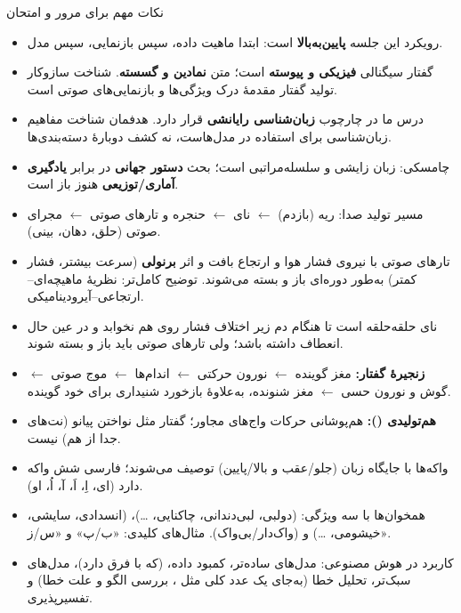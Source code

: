 \begin{exambox}{نکات مهم برای مرور و امتحان}
\begin{itemize}
  \item رویکرد این جلسه \textbf{پایین‌به‌بالا} است: ابتدا ماهیت داده، سپس بازنمایی، سپس مدل.
  \item گفتار سیگنالی \textbf{فیزیکی و پیوسته} است؛ متن \textbf{نمادین و گسسته}. شناخت سازوکار تولید گفتار مقدمهٔ درک ویژگی‌ها و بازنمایی‌های صوتی است.
  \item درس ما در چارچوب \textbf{زبان‌شناسی رایانشی} قرار دارد. هدفمان شناخت مفاهیم زبان‌شناسی برای استفاده در مدل‌هاست، نه کشف دوبارهٔ دسته‌بندی‌ها.
  \item چامسکی: زبان زایشی و سلسله‌مراتبی است؛ بحث \textbf{دستور جهانی} در برابر \textbf{یادگیری آماری/توزیعی} هنوز باز است.
  \item مسیر تولید صدا: ریه (بازدم) $\leftarrow$ نای $\leftarrow$ حنجره و تارهای صوتی $\leftarrow$ مجرای صوتی (حلق، دهان، بینی).
  \item تارهای صوتی با نیروی فشار هوا و ارتجاع بافت و اثر \textbf{برنولی} (سرعت بیشتر، فشار کمتر) به‌طور دوره‌ای باز و بسته می‌شوند. توضیح کامل‌تر: نظریهٔ ماهیچه‌ای–ارتجاعی–آیرودینامیکی.
  \item نای حلقه‌حلقه است تا هنگام دم زیر اختلاف فشار روی هم نخوابد و در عین حال انعطاف داشته باشد؛ ولی تارهای صوتی باید باز و بسته شوند.
  \item \textbf{زنجیرهٔ گفتار:} مغز گوینده $\leftarrow$ نورون حرکتی $\leftarrow$ اندام‌ها $\leftarrow$ موج صوتی $\leftarrow$ گوش و نورون حسی $\leftarrow$ مغز شنونده، به‌علاوهٔ بازخورد شنیداری برای خود گوینده.
  \item \textbf{هم‌تولیدی ():} هم‌پوشانی حرکات واج‌های مجاور؛ گفتار مثل نواختن پیانو (نت‌های جدا از هم) نیست.
  \item واکه‌ها با جایگاه زبان (جلو/عقب و بالا/پایین) توصیف می‌شوند؛ فارسی شش واکه دارد (ای، اِ، اَ، آ، اُ، او).
  \item همخوان‌ها با سه ویژگی: \textbf{} (دولبی، لبی‌دندانی، چاکنایی، \ldots)، \textbf{} (انسدادی، سایشی، خیشومی، \ldots) و \textbf{} (واک‌دار/بی‌واک). مثال‌های کلیدی: «ب/پ» و «س/ز».
  \item کاربرد در هوش مصنوعی: مدل‌های ساده‌تر، کمبود داده،  (که با  فرق دارد)، مدل‌های سبک‌تر، تحلیل خطا (به‌جای یک عدد کلی مثل ، بررسی الگو و علت خطا) و تفسیرپذیری.
\end{itemize}
\end{exambox}
